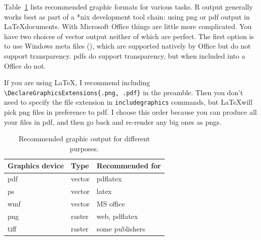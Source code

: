 Table~\ref{tbl:graphic-recommendation} lists recommended graphic formats for various tasks.  R output generally works best as part of a *nix development tool chain: using png or pdf output in \LaTeX documents.  With Microsoft Office things are little more complicated.  You have two choices of vector output neither of which are perfect.  The first option is to use Windows meta files (), which are supported natively by Office but do not support transparency.  {\sc pdf}s do support transparency, but when included into a Office do not.

If you are using \LaTeX, I recommend including \verb|\DeclareGraphicsExtensions{.png, .pdf}| in the preamble.  Then you don't need to specify the file extension in \verb|includegraphics| commands, but \LaTeX will pick png files in preference to pdf.  I choose this order because you can produce all your files in pdf, and then go back and re-render any big ones as pngs.

\begin{table}
  \begin{center}
  \begin{tabular}{lll}
    \toprule
    Graphics device & Type & Recommended for \\
    \midrule
    pdf   & vector & pdflatex\\
    ps    & vector & latex \\
    wmf   & vector & MS office \\
    png   & raster & web, pdflatex \\
    tiff  & raster & some publishers \\
    \bottomrule 
  \end{tabular}
  \end{center}
  \caption{Recommended graphic output for different purposes.}
  \label{tbl:graphic-recommendation}
\end{table}


